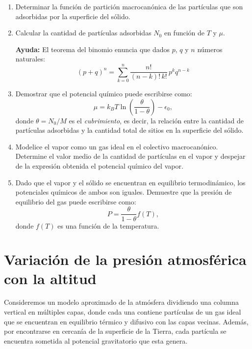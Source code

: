 \documentclass[a4paper,11pt]{article}
\begin{document}
\begin{enumerate}[label=(\alph*),
                  leftmargin=2\parindent,
                  rightmargin=2\parindent]

    \item{Determinar la función de partición macrocanónica de las 
          partículas que son adsorbidas por la superficie del sólido.}

    \item{Calcular la cantidad de partículas adsorbidas $N_0$ en función de 
          $T$ y $\mu$.}
          
    {\small
    \textbf{Ayuda:}
    El teorema del binomio enuncia que dados $p$, $q$ y $n$ números 
    naturales:
    $$ (p + q)^n = \sum_{k=0}^n \frac{n!}{(n-k)! \, k!} \, p^k q^{n-k} $$
    }
    
    \item{Demostrar que el potencial químico puede escribirse 
          como:
          $$
          \mu =
          k_B T \ln \left( \frac{\theta}{1 - \theta} \right) - \epsilon_0,
          $$
          donde $\theta = N_0/M$ es el \emph{cubrimiento}, es decir, la 
          relación entre la cantidad de partículas adsorbidas y la cantidad 
          total de sitios en la superficie del sólido.
          }
    
    \item{Modelice el vapor como un gas ideal en el colectivo macrocanónico.
          Determine el valor medio de la cantidad de partículas en el vapor y 
          despejar de la expresión obtenida el potencial químico del vapor.
          }
    
    \item{Dado que el vapor y el sólido se encuentran en equilibrio 
          termodinámico, los potenciales químicos de ambos son iguales. 
          Demuestre que la presión de equilibrio del gas puede escribirse 
          como:
          $$ P = \frac{\theta}{1 - \theta} f(T), $$
          donde $f(T)$ es una función de la temperatura.
          }

\end{enumerate}



\section{Variación de la presión atmosférica con la altitud}

Consideremos un modelo aproximado de la atmósfera dividiendo una 
columna vertical en múltiples capas, donde cada una contiene partículas 
de un gas ideal que se encuentran en equilibrio térmico y difusivo con 
las capas vecinas. Además, por encontrarse en cercanía de la superficie 
de la Tierra, cada partícula se encuentra sometida al potencial 
gravitatorio que esta genera.
\end{document}
